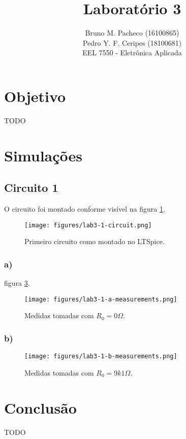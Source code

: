 \documentclass[a4paper]{report}
\begin{document}
 
\title{Laboratório 3}
\author{Bruno M. Pacheco (16100865)\\
Pedro Y. F. Ceripes (18100681) \\
EEL 7550 - Eletrônica Aplicada}
 
\maketitle

\section*{Objetivo}
 
TODO
 
\section*{Simulações}

\subsection*{Circuito 1}

O circuito foi montado conforme visível na figura \ref{fig:figures-lab3-1-circuit-png}.

\begin{figure}[H]
    \centering
    \texttt{[image: figures/lab3-1-circuit.png]}
    \caption{Primeiro circuito como montado no LTSpice.}
    \label{fig:figures-lab3-1-circuit-png}
\end{figure}

\subsubsection*{a)}

figura \ref{fig:figures-lab3-1-a-measurements-png}.

\begin{figure}[H]
    \centering
    \texttt{[image: figures/lab3-1-a-measurements.png]}
    \caption{Medidas tomadas com $R_0=0 \Omega$.}
    \label{fig:figures-lab3-1-a-measurements-png}
\end{figure}

\subsubsection*{b)}


\begin{figure}[H]
    \centering
    \texttt{[image: figures/lab3-1-b-measurements.png]}
    \caption{Medidas tomadas com $R_0=9k1 \Omega$.}
    \label{fig:figures-lab3-1-a-measurements-png}
\end{figure}



\section*{Conclusão}

TODO
\end{document}
